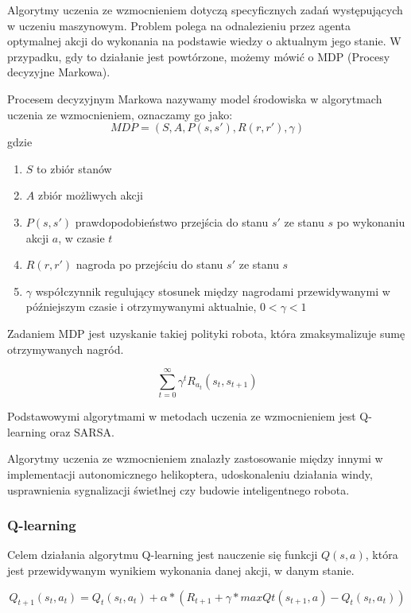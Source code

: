 Algorytmy uczenia ze wzmocnieniem dotyczą specyficznych zadań występujących w uczeniu maszynowym. Problem polega na 
odnalezieniu przez agenta optymalnej akcji do wykonania na podstawie wiedzy o aktualnym jego stanie. W przypadku, 
gdy to działanie jest powtórzone, możemy mówić o MDP (Procesy decyzyjne Markowa).

Procesem decyzyjnym Markowa nazywamy model środowiska w algorytmach uczenia ze wzmocnieniem, oznaczamy go jako:\\
$$MDP = (S, A, P(s, s'), R(r, r'), \gamma)$$
gdzie
\begin{enumerate}
 \item $S$ to zbiór stanów
 \item $A$ zbiór możliwych akcji
 \item $P(s, s')$ prawdopodobieństwo przejścia do stanu $s'$ ze stanu $s$ po wykonaniu akcji $a$, w czasie $t$
 \item $R(r, r')$ nagroda po przejściu do stanu $s'$ ze stanu $s$
 \item $\gamma$ współczynnik regulujący stosunek między nagrodami przewidywanymi w późniejszym czasie i 
otrzymywanymi aktualnie, $0 < \gamma < 1$
\end{enumerate}

Zadaniem MDP jest uzyskanie takiej polityki robota, która zmaksymalizuje sumę otrzymywanych nagród.

$$\sum\limits_{t=0}^\infty \gamma^{t} R_{a_{t}}(s_{t}, s_{t+1})$$

Podstawowymi algorytmami w metodach uczenia ze wzmocnieniem jest Q-learning\cite{watkins1992q} oraz 
SARSA\cite{rummery1994line}.

  Algorytmy uczenia ze wzmocnieniem znalazły zastosowanie między innymi w implementacji autonomicznego 
helikoptera\cite{abbeel2007application}, udoskonaleniu działania windy\cite{barto1996improving}, usprawnienia 
sygnalizacji świetlnej\cite{wiering2000multi} czy budowie inteligentnego robota\cite{kimura2001reinforcement}.


\subsubsection{Q-learning}
\label{subsubsec:qlearning}

Celem działania algorytmu Q-learning jest nauczenie się funkcji $Q(s, a)$, która jest przewidywanym wynikiem wykonania 
danej akcji, w danym stanie.

$$Q_{t+1}(s_{t}, a_{t}) = Q_{t}(s_{t}, a_{t}) + \alpha * ( R_{t+1} + \gamma * max Qt(s_{t+1}, a) - Q_{t}(s_{t}, 
a_{t}))$$ 

